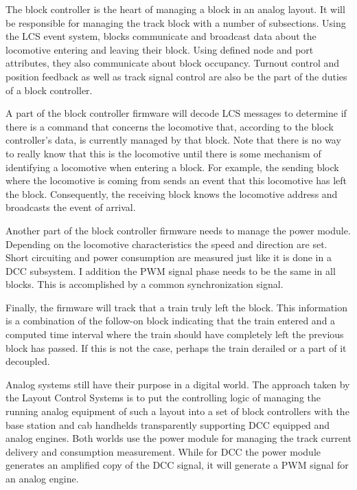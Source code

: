 
The block controller is the heart of managing a block in an analog layout. It will be responsible for managing the track block with a number of subsections. Using the LCS event system, blocks communicate and broadcast data about the locomotive entering and leaving their block. Using defined node and port attributes, they also communicate about block occupancy. Turnout control and position feedback as well as track signal control are also be the part of the duties of a block controller.

A part of the block controller firmware will decode LCS messages to determine if there is a command that concerns the locomotive that, according to the block controller’s data, is currently managed by that block. Note that there is no way to really know that this is the locomotive until there is some mechanism of identifying a locomotive when entering a block. For example, the sending block where the locomotive is coming from sends an event that this locomotive has left the block. Consequently, the receiving block knows the locomotive address and broadcasts the event of arrival.

Another part of the block controller firmware needs to manage the power module. Depending on the locomotive characteristics the speed and direction are set. Short circuiting and power consumption are measured just like it is done in a DCC subsystem. I addition the PWM signal phase needs to be the same in all blocks. This is accomplished by a common synchronization signal.

Finally, the firmware will track that a train truly left the block. This information is a combination of the follow-on block indicating that the train entered and a computed time interval where the train should have completely left the previous block has passed. If this is not the case, perhaps the train derailed or a part of it decoupled.


Analog systems still have their purpose in a digital world. The approach taken by the Layout Control Systems is to put the controlling logic of managing the running analog equipment of such a layout into a set of block controllers with the base station and cab handhelds transparently supporting DCC equipped and analog engines. Both worlds use the power module for managing the track current delivery and consumption measurement. While for DCC the power module generates an amplified copy of the DCC signal, it will generate a PWM signal for an analog engine.

